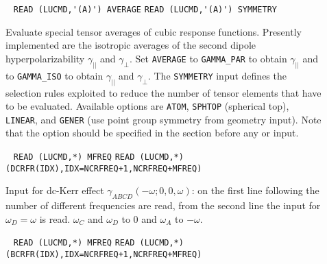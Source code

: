 \begin{center}
\end{center}

\begin{description}
\item[] \verb| |\newline
\verb|READ (LUCMD,'(A)') AVERAGE|\newline
\verb|READ (LUCMD,'(A)') SYMMETRY|

Evaluate special tensor averages of cubic response functions.
Presently implemented are the isotropic averages of the second
dipole hyperpolarizability
$\gamma_{||}$ and $\gamma_{\bot}$.
Set \verb+AVERAGE+ to \verb+GAMMA_PAR+ 
to obtain $\gamma_{||}$ and to
\verb+GAMMA_ISO+ to obtain $\gamma_{||}$ and $\gamma_{\bot}$.
The \verb+SYMMETRY+ input defines the selection rules 
exploited to reduce the number of tensor elements that have to be
evaluated. Available options are
\verb+ATOM+, \verb+SPHTOP+ (spherical top), \verb+LINEAR+,
and \verb+GENER+ (use point group symmetry from geometry input).
Note that the  option should be specified in the 
section before any  or  input.
 
\item[] \verb| |\newline
\verb|READ (LUCMD,*) MFREQ|\newline
\verb|READ (LUCMD,*) (DCRFR(IDX),IDX=NCRFREQ+1,NCRFREQ+MFREQ)|

Input for dc-Kerr effect $\gamma_{ABCD}(-\omega;0,0,\omega)$:
on the first line following  the number of different
frequencies are read, from the second line the input for
$\omega_D = \omega$ is read. $\omega_C$ and $\omega_D$ to $0$
and $\omega_A$ to $-\omega$. 
 
\item[] \verb| |\newline
\verb|READ (LUCMD,*) MFREQ|\newline
\verb|READ (LUCMD,*) (BCRFR(IDX),IDX=NCRFREQ+1,NCRFREQ+MFREQ)|


\end{description}
